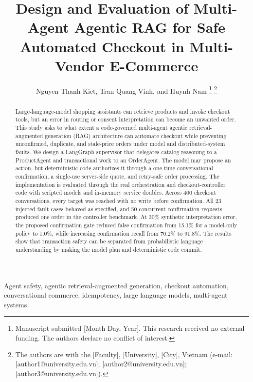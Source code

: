 \documentclass{IEEEtran}
\begin{document}
\title{Design and Evaluation of Multi-Agent Agentic RAG for Safe Automated Checkout in Multi-Vendor E-Commerce}

\author{ Nguyen Thanh Kiet, Tran Quang Vinh, and Huynh Nam
\thanks{Manuscript submitted [Month Day, Year]. This research received no external funding. The authors declare no conflict of interest.}
\thanks{The authors are with the [Faculty], [University], [City], Vietnam (e-mail: [author1@university.edu.vn]; [author2@university.edu.vn]; [author3@university.edu.vn]).}}

\maketitle

\begin{abstract}
Large-language-model shopping assistants can retrieve products and invoke checkout tools, but an error in routing or consent interpretation can become an unwanted order. This study asks to what extent a code-governed multi-agent agentic retrieval-augmented generation (RAG) architecture can automate checkout while preventing unconfirmed, duplicate, and stale-price orders under model and distributed-system faults. We design a LangGraph supervisor that delegates catalog reasoning to a ProductAgent and transactional work to an OrderAgent. The model may propose an action, but deterministic code authorizes it through a one-time conversational confirmation, a single-use server-side quote, and retry-safe order processing. The implementation is evaluated through the real orchestration and checkout-controller code with scripted models and in-memory service doubles. Across 400 checkout conversations, every target was reached with no write before confirmation. All 23 injected fault cases behaved as specified, and 50 concurrent confirmation requests produced one order in the controller benchmark. At 30\% synthetic interpretation error, the proposed confirmation gate reduced false confirmation from 15.1\% for a model-only policy to 1.0\%, while increasing confirmation recall from 70.2\% to 91.8\%. The results show that transaction safety can be separated from probabilistic language understanding by making the model plan and deterministic code commit.
\end{abstract}

\begin{IEEEkeywords}
Agent safety, agentic retrieval-augmented generation, checkout automation, conversational commerce, idempotency, large language models, multi-agent systems
\end{IEEEkeywords}
\end{document}
